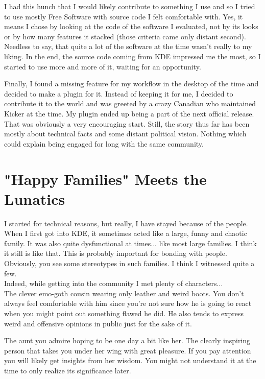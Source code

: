 I had this hunch that I would likely contribute to something I use and so I
tried to use mostly Free Software with source code I felt comfortable with.
Yes, it means I chose by looking at the code of the software I evaluated, not
by its looks or by how many features it stacked (those criteria came only
distant second). Needless to say, that quite a lot of the software at the time
wasn't really to my liking. In the end, the source code coming from KDE
impressed me the most, so I started to use more and more of it, waiting for an
opportunity.

Finally, I found a missing feature for my workflow in the desktop of the time
and decided to make a plugin for it. Instead of keeping it for me, I decided to
contribute it to the world and was greeted by a crazy Canadian who maintained
Kicker at the time. My plugin ended up being a part of the next official release. \\

That was obviously a very encouraging start. Still, the story thus far has been  mostly about
technical facts and some distant political vision. Nothing which could explain
being engaged for long with the same community.

\section*{"Happy Families" Meets the Lunatics}
I started for technical reasons, but really, I have stayed because of the people.
When I first got into KDE, it sometimes acted like a large, funny and chaotic family.
It was also quite dysfunctional at times... like most large families. I think it
still is like that. This is probably important for bonding with people. Obviously,
you see some stereotypes in such families. I think I witnessed quite a few.\\

Indeed, while getting into the community I met plenty of characters... \\

The clever emo-goth cousin wearing only leather and weird boots. You don't
always feel comfortable with him since you're not sure how he is going to react
when you might point out something flawed he did. He also tends to express
weird and offensive opinions in public just for the sake of it.

The aunt you admire hoping to be one day a bit like her. The clearly inspiring
person that takes you under her wing with great pleasure. If you pay attention
you will likely get insights from her wisdom. You might not understand it at
the time to only realize its significance later.

